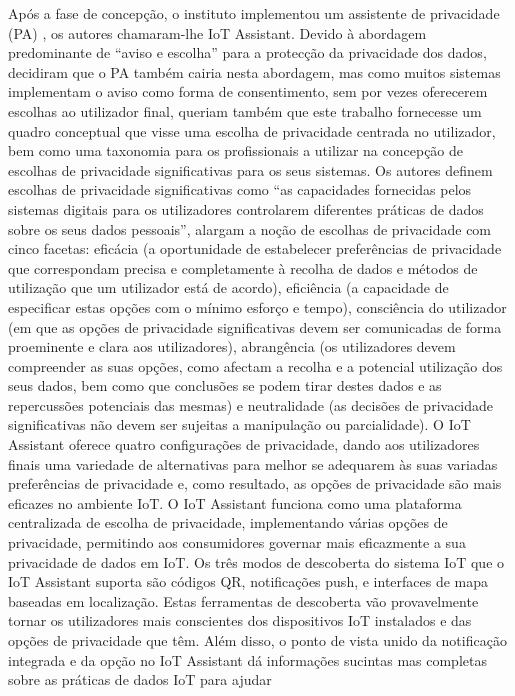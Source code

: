 \documentclass[conference]{IEEEtran}
\begin{document}
Após a fase de concepção, o instituto implementou um assistente de privacidade
(PA) \cite{FengDesign}, os autores chamaram-lhe IoT Assistant. Devido à
abordagem predominante de ``aviso e escolha'' para a protecção da privacidade
dos dados, decidiram que o PA também cairia nesta abordagem, mas como muitos
sistemas implementam o aviso como forma de consentimento, sem por vezes
oferecerem escolhas ao utilizador final, queriam também que este trabalho
fornecesse um quadro conceptual que visse uma escolha de privacidade centrada
no utilizador, bem como uma taxonomia para os profissionais a utilizar na
concepção de escolhas de privacidade significativas para os seus sistemas.
Os autores definem escolhas de privacidade significativas como ``as capacidades
fornecidas pelos sistemas digitais para os utilizadores controlarem diferentes
práticas de dados sobre os seus dados pessoais'', alargam a noção de escolhas
de privacidade com cinco facetas: eficácia (a oportunidade de estabelecer
preferências de privacidade que correspondam precisa e completamente à recolha
de dados e métodos de utilização que um utilizador está de acordo), eficiência
(a capacidade de especificar estas opções com o mínimo esforço e tempo),
consciência do utilizador (em que as opções de privacidade significativas devem
ser comunicadas de forma proeminente e clara aos utilizadores), abrangência (os
utilizadores devem compreender as suas opções, como afectam a recolha e a
potencial utilização dos seus dados, bem como que conclusões se podem tirar
destes dados e as repercussões potenciais das mesmas) e neutralidade (as decisões
de privacidade significativas não devem ser sujeitas a manipulação ou parcialidade).
O IoT Assistant oferece quatro configurações de privacidade, dando aos
utilizadores finais uma variedade de alternativas para melhor se adequarem
às suas variadas preferências de privacidade e, como resultado, as opções
de privacidade são mais eficazes no ambiente IoT. O IoT Assistant funciona
como uma plataforma centralizada de escolha de privacidade, implementando
várias opções de privacidade, permitindo aos consumidores governar mais
eficazmente a sua privacidade de dados em IoT. Os três modos de descoberta
do sistema IoT que o IoT Assistant suporta são códigos QR, notificações
push, e interfaces de mapa baseadas em localização. Estas ferramentas de
descoberta vão provavelmente tornar os utilizadores mais conscientes dos
dispositivos IoT instalados e das opções de privacidade que têm. Além disso,
o ponto de vista unido da notificação integrada e da opção no IoT Assistant
dá informações sucintas mas completas sobre as práticas de dados IoT para ajudar
\end{document}
